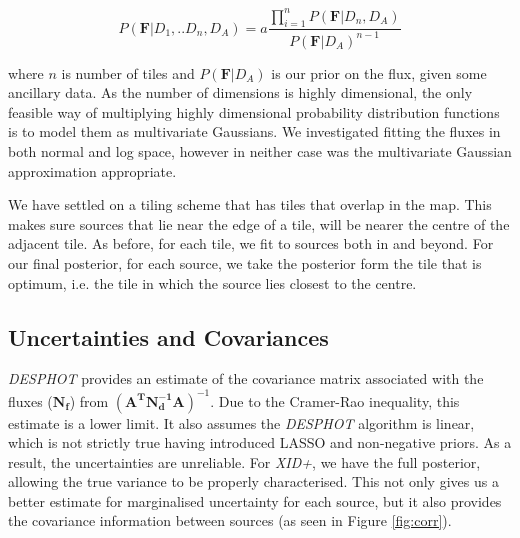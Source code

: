 \documentclass[useAMS,usenatbib]{mnras}
\begin{document}
\begin{equation}
P(\mathbf{F}|D_1,..D_n,D_A)=a\frac{\prod_{i=1}^n P(\mathbf{F}|D_n,D_A)}{P(\mathbf{F}|D_A)^{n-1}}
\end{equation}

where $n$ is number of tiles and $P(\mathbf{F}|D_A)$ is our prior on the flux, given some ancillary data. As the number of dimensions is highly dimensional, the only feasible way of multiplying highly dimensional probability distribution functions is to model them as multivariate Gaussians. We investigated fitting the fluxes in both normal and log space, however in neither case was the multivariate Gaussian approximation appropriate.

We have settled on a tiling scheme that has tiles that overlap in the map. This makes sure sources that lie near the edge of a tile, will be nearer the centre of the adjacent tile. As before, for each tile, we fit to sources both in and beyond. For our final posterior, for each source, we take the posterior form the tile that is optimum, i.e. the tile in which the source lies closest to the centre.

\subsection{Uncertainties and Covariances}
\emph{DESPHOT} provides an estimate of the covariance matrix associated with the fluxes ($\mathbf{N_f}$) from $(\mathbf{A^TN_d^{-1}A})^{-1}$. Due to the Cramer-Rao inequality, this estimate is a lower limit. It also assumes the \emph{DESPHOT} algorithm is linear, which is not strictly true having introduced LASSO and non-negative priors. As a result, the uncertainties are unreliable. For \emph{XID+}, we have the full posterior, allowing the true variance to be properly characterised. This not only gives us a better estimate for marginalised uncertainty for each source, but it also provides the covariance information between sources (as seen in Figure \ref{fig:corr}). 
%
\end{document}
